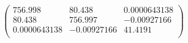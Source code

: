 \documentclass{article}
\begin{document}
\[\left(
\begin{array}{ccc}
 756.998 & 80.438 & 0.0000643138 \\
 80.438 & 756.997 & -0.00927166 \\
 0.0000643138 & -0.00927166 & 41.4191 \\
\end{array}
\right)\]
\end{document}
